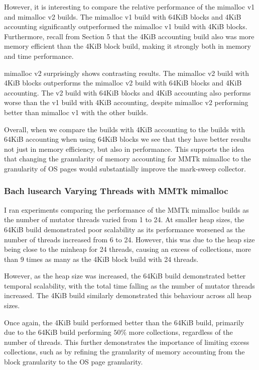 \documentclass{article}
\begin{document}
However, it is interesting to compare the relative performance of the mimalloc v1 and mimalloc v2 builds. The mimalloc v1 build with 64KiB blocks and 4KiB accounting significantly outperformed the mimalloc v1 build with 4KiB blocks. Furthermore, recall from Section 5 that the 4KiB accounting build also was more memory efficient than the 4KiB block build, making it strongly both in memory and time performance.

mimalloc v2 surprisingly shows contrasting results. The mimalloc v2 build with 4KiB blocks outperforms the mimalloc v2 build with 64KiB blocks and 4KiB accounting. The v2 build with 64KiB blocks and 4KiB accounting also performs worse than the v1 build with 4KiB accounting, despite mimalloc v2 performing better than mimalloc v1 with the other builds.

Overall, when we compare the builds with 4KiB accounting to the builds with 64KiB accounting when using 64KiB blocks we see that they have better results not just in memory efficiency, but also in performance. This supports the idea that changing the granularity of memory accounting for MMTk mimalloc to the granularity of OS pages would substantially improve the mark-sweep collector.

\subsubsection{Bach lusearch Varying Threads with MMTk mimalloc}
I ran experiments comparing the performance of the MMTk mimalloc builds as the number of mutator threads varied from 1 to 24. At smaller heap sizes, the 64KiB build demonstrated poor scalability as its performance worsened as the number of threads increased from 6 to 24. However, this was due to the heap size being close to the minheap for 24 threads, causing an excess of collections, more than 9 times as many as the 4KiB block build with 24 threads.

However, as the heap size was increased, the 64KiB build demonstrated better temporal scalability, with the total time falling as the number of mutator threads increased. The 4KiB build similarly demonstrated this behaviour across all heap sizes.

Once again, the 4KiB build performed better than the 64KiB build, primarily due to the 64KiB build performing $50\%$ more collections, regardless of the number of threads. This further demonstrates the importance of limiting excess collections, such as by refining the granularity of memory accounting from the block granularity to the OS page granularity.
\end{document}
